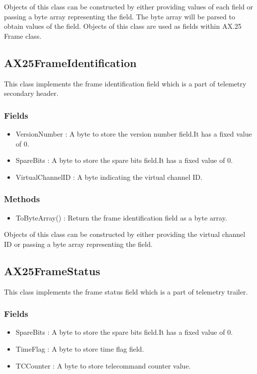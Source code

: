 \documentclass[BTech]{iitmdiss}
\begin{document}
Objects of this class can be constructed by either providing values of each field or passing a byte array representing the field. The byte array will be parsed to obtain values of the field. Objects of this class are used as fields within AX.25 Frame class.

\subsection{AX25FrameIdentification}
This class implements the frame identification field which is a part of telemetry secondary header.
\subsubsection{Fields}
\begin{itemize}
\item VersionNumber : A byte to store the version number field.It has a fixed value of 0.
\item SpareBits :  A byte to store the spare bits field.It has a fixed value of 0.
\item VirtualChannelID :  A byte indicating the virtual channel ID.
\end{itemize}

\subsubsection{Methods}
\begin{itemize}
\item ToByteArray() : Return the frame identification field as a byte array.
\end{itemize}

Objects of this class can be constructed by either providing the virtual channel ID or passing a byte array representing the field.

\subsection{AX25FrameStatus}
This class implements the frame status field which is a part of telemetry trailer.
\subsubsection{Fields}
\begin{itemize}
\item SpareBits : A byte to store the spare bits field.It has a fixed value of 0.
\item TimeFlag : A byte to store time flag field.
\item TCCounter : A byte to store telecommand counter value. 
\end{itemize}
\end{document}
